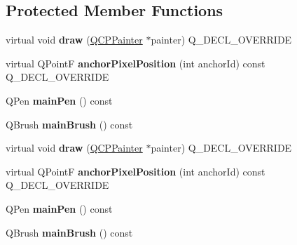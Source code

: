 \subsection*{Protected Member Functions}
\begin{DoxyCompactItemize}
\item 
\mbox{\label{class_q_c_p_item_ellipse_a77eebd67a402fc496082a2e51356928c}} 
virtual void {\bfseries draw} (\hyperlink{class_q_c_p_painter}{Q\+C\+P\+Painter} $\ast$painter) Q\+\_\+\+D\+E\+C\+L\+\_\+\+O\+V\+E\+R\+R\+I\+DE
\item 
\mbox{\label{class_q_c_p_item_ellipse_a35cd6983c61a16ac33c23f08dd2817cc}} 
virtual Q\+PointF {\bfseries anchor\+Pixel\+Position} (int anchor\+Id) const Q\+\_\+\+D\+E\+C\+L\+\_\+\+O\+V\+E\+R\+R\+I\+DE
\item 
\mbox{\label{class_q_c_p_item_ellipse_a9c11717026dfd685c83a9650666b7181}} 
Q\+Pen {\bfseries main\+Pen} () const
\item 
\mbox{\label{class_q_c_p_item_ellipse_a6218bdf5e703f609b934b0bf9c8d0971}} 
Q\+Brush {\bfseries main\+Brush} () const
\item 
\mbox{\label{class_q_c_p_item_ellipse_ad0ec07724af3430dff1c64774ec237db}} 
virtual void {\bfseries draw} (\hyperlink{class_q_c_p_painter}{Q\+C\+P\+Painter} $\ast$painter) Q\+\_\+\+D\+E\+C\+L\+\_\+\+O\+V\+E\+R\+R\+I\+DE
\item 
\mbox{\label{class_q_c_p_item_ellipse_a6892d099d160b3941b78e9f7e9a4fabc}} 
virtual Q\+PointF {\bfseries anchor\+Pixel\+Position} (int anchor\+Id) const Q\+\_\+\+D\+E\+C\+L\+\_\+\+O\+V\+E\+R\+R\+I\+DE
\item 
\mbox{\label{class_q_c_p_item_ellipse_a9c11717026dfd685c83a9650666b7181}} 
Q\+Pen {\bfseries main\+Pen} () const
\item 
\mbox{\label{class_q_c_p_item_ellipse_a6218bdf5e703f609b934b0bf9c8d0971}} 
Q\+Brush {\bfseries main\+Brush} () const
\end{DoxyCompactItemize}
